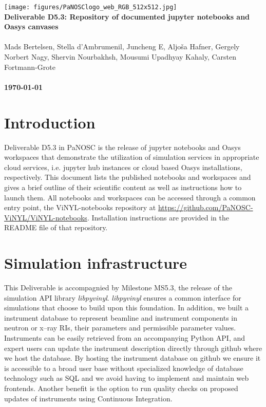 \documentclass[10pt]{scrartcl}
\begin{document}
\makeatletter
\begin{titlepage}
\thispagestyle{scrheadings}
\ohead{}
\ihead{}
\chead{}
\ifoot{}
\ofoot{}
\noindent%
\texttt{[image: figures/PaNOSClogo\_web\_RGB\_512x512.jpg]}\\
\Huge{%
\renewcommand{\baselinestretch}{2.0}%
  \textbf{%
    Deliverable D5.3: Repository of documented jupyter notebooks and Oasys canvases\\
  }%
}%
\\
{%
\Large{%
  Mads Bertelsen,
  Stella d'Ambrumenil,
  Juncheng E,
  Aljo\v{s}a Hafner,
  Gergely Norbert Nagy,
  Shervin Nourbakhsh,
  Mousumi Upadhyay Kahaly,
  Carsten Fortmann-Grote
  \bigskip\\
  \bigskip\\
  \textbf{\today}%
}}%
\end{titlepage}
\makeatother

\section{Introduction}
\label{sec:introduction}
Deliverable D5.3 in PaNOSC is the release of jupyter notebooks and Oasys
workspaces
that demonstrate the utilization of simulation services in appropriate cloud
services, i.e. jupyter hub instances or cloud based Oasys installations,
respectively. This document lists the published notebooks and workspaces and
gives a brief outline of their scientific content as well as instructions how to
launch them. All notebooks and workspaces can be accessed through a common entry
point, the ViNYL-notebooks repository at
\url{https://github.com/PaNOSC-ViNYL/ViNYL-notebooks}. Installation instructions
are provided in the README file of that repository.

\section{Simulation infrastructure}
\label{sec:simulation_infrastructure}
This Deliverable is accompagnied by Milestone MS5.3, the release of the
simulation API library \textit{libpyvinyl}. \textit{libpyvinyl}
ensures a common interface for
simulations that choose to build upon this foundation. In addition, we built
a instrument database to represent beamline and instrument components in neutron
or x--ray RIs, their parameters and permissible parameter values.
Instruments can be easily retrieved from an
accompanying Python API, and expert users can update the instrument description
directly through github where we host the database. By hosting the instrument
database on github we ensure it is accessible to a broad user base without
specialized knowledge of database technology such as SQL and we avoid having to
implement and maintain web frontends. Another benefit is the
option to run quality checks on proposed updates of instruments using
Continuous Integration.
\end{document}
